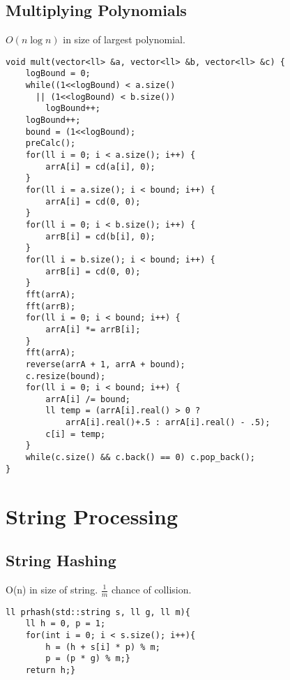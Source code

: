 \documentclass[10pt]{article}{\twocolumn}
\begin{document}
\subsection{Multiplying Polynomials}
$O(n\log{n})$ in size of largest polynomial.
\begin{lstlisting}
void mult(vector<ll> &a, vector<ll> &b, vector<ll> &c) {
    logBound = 0;
    while((1<<logBound) < a.size() 
      || (1<<logBound) < b.size()) 
        logBound++;
    logBound++;
    bound = (1<<logBound);
    preCalc();
    for(ll i = 0; i < a.size(); i++) {
        arrA[i] = cd(a[i], 0);
    }
    for(ll i = a.size(); i < bound; i++) {
        arrA[i] = cd(0, 0);
    }
    for(ll i = 0; i < b.size(); i++) {
        arrB[i] = cd(b[i], 0);
    }
    for(ll i = b.size(); i < bound; i++) {
        arrB[i] = cd(0, 0);
    }
    fft(arrA);
    fft(arrB);
    for(ll i = 0; i < bound; i++) {
        arrA[i] *= arrB[i];
    }
    fft(arrA);
    reverse(arrA + 1, arrA + bound);
    c.resize(bound);
    for(ll i = 0; i < bound; i++) {
        arrA[i] /= bound;
        ll temp = (arrA[i].real() > 0 ? 
            arrA[i].real()+.5 : arrA[i].real() - .5);
        c[i] = temp;
    }
    while(c.size() && c.back() == 0) c.pop_back();
}
\end{lstlisting}




\section{String Processing}

\subsection{String Hashing}
O(n) in size of string. $\frac{1}{m}$ chance of collision.
\begin{lstlisting}
ll prhash(std::string s, ll g, ll m){
    ll h = 0, p = 1;
    for(int i = 0; i < s.size(); i++){
        h = (h + s[i] * p) % m;
        p = (p * g) % m;}
    return h;}
\end{lstlisting}
\end{document}
